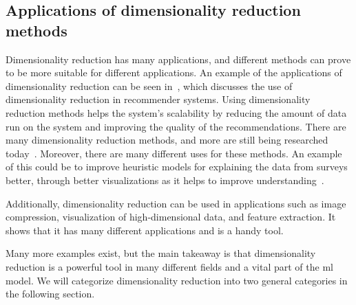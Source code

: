 \subsection{Applications of dimensionality reduction methods}

Dimensionality reduction has many applications, and different methods can prove to be more suitable for different applications. An example of the applications of dimensionality reduction can be seen in~\cite{sarwar2000application}, which discusses the use of dimensionality reduction in recommender systems. Using dimensionality reduction methods helps the system's scalability by reducing the amount of data run on the system and improving the quality of the recommendations.
There are many dimensionality reduction methods, and more are still being researched today~\cite{dimensionality-reduction-cheng}. Moreover, there are many different uses for these methods. An example of this could be to improve heuristic models for explaining the data from surveys better, through better visualizations as it helps to improve understanding~\cite{dimensionality-reduction-cheng}.

Additionally, dimensionality reduction can be used in applications such as image compression, visualization of high-dimensional data, and feature extraction. It shows that it has many different applications and is a handy tool.

Many more examples exist, but the main takeaway is that dimensionality reduction is a powerful tool in many different fields and a vital part of the \gls{ml} model. We will categorize dimensionality reduction into two general categories in the following section.

